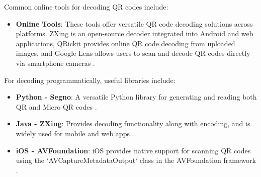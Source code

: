 Common online tools for decoding QR codes include:
\begin{itemize}
	\item \textbf{Online Tools}: These tools offer versatile QR code decoding solutions across platforms. ZXing is an open-source decoder integrated into Android and web applications, QRickit provides online QR code decoding from uploaded images, and Google Lens allows users to scan and decode QR codes directly via smartphone cameras \cite{ZXing2024, QRickit2024}.
	
\end{itemize}

For decoding programmatically, useful libraries include:
\begin{itemize}
	\item \textbf{Python - Segno}: A versatile Python library for generating and reading both QR and Micro QR codes \cite{Segno2024}.
	\item \textbf{Java - ZXing}: Provides decoding functionality along with encoding, and is widely used for mobile and web apps \cite{ZXing2024}.
	\item \textbf{iOS - AVFoundation}: iOS provides native support for scanning QR codes using the `AVCaptureMetadataOutput` class in the AVFoundation framework \cite{AVFoundation2024}.
\end{itemize}


